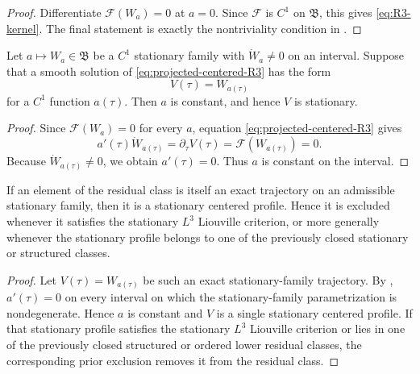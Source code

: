 \begin{proof}
Differentiate \(\mathcal F(W_a)=0\) at \(a=0\).  Since \(\mathcal F\) is \(C^1\)
on \(\mathfrak B\), this gives \eqref{eq:R3-kernel}.  The final statement is
exactly the nontriviality condition in .
\end{proof}

\begin{lemma}
\label{lem:R3-family-constrained-stationary}
Let \(a\mapsto W_a\in\mathfrak B\) be a \(C^1\) stationary family with
\(\dot W_a\ne0\) on an interval.  Suppose that a smooth solution of
\eqref{eq:projected-centered-R3} has the form
\begin{equation}\label{eq:R3-family-trajectory}
   V(\tau)=W_{a(\tau)}
\end{equation}
for a \(C^1\) function \(a(\tau)\).  Then \(a\) is constant, and hence
\(V\) is stationary.
\end{lemma}

\begin{proof}
Since \(\mathcal F(W_a)=0\) for every \(a\), equation
\eqref{eq:projected-centered-R3} gives
\[
   a'(\tau)\dot W_{a(\tau)}=\partial_\tau V(\tau)=\mathcal F(W_{a(\tau)})=0 .
\]
Because \(\dot W_{a(\tau)}\ne0\), we obtain \(a'(\tau)=0\).  Thus \(a\) is
constant on the interval.
\end{proof}

\begin{corollary}
\label{cor:R3-exact-family-subcase}
If an element of the residual class is itself an exact trajectory on an
admissible stationary family, then it is a stationary centered profile.  Hence
it is excluded whenever it satisfies the stationary \(L^3\) Liouville
criterion, or more generally whenever the stationary profile belongs to one of
the previously closed stationary or structured classes.
\end{corollary}

\begin{proof}
Let \(V(\tau)=W_{a(\tau)}\) be such an exact stationary-family trajectory.  By
, \(a'(\tau)=0\) on every interval on
which the stationary-family parametrization is nondegenerate.  Hence \(a\) is constant and
\(V\) is a single stationary centered profile.  If that stationary profile
satisfies the stationary \(L^3\) Liouville criterion or lies in one of the
previously closed structured or ordered lower residual classes, the corresponding
prior exclusion removes it from the residual class.
\end{proof}

